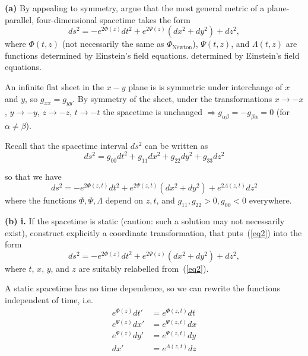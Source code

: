\documentclass[a4paper]{article} %
\begin{document}
\begin{framed}
\textbf{(a)} By appealing to symmetry, argue that the most general metric of a plane-parallel, four-dimensional spacetime takes the form 
\begin{equation}
ds^2=-e^{2\Phi (z)}dt^2 + e^{2\Psi (z)}(dx^2+dy^2)+dz^2,\label{eq2}
\end{equation}
where $\Phi(t,z)$ (not necessarily the same as $\Phi_{\text{Newton}}$), $\Psi(t,z)$, and $\Lambda(t,z)$ are functions determined by Einstein's field equations.
determined by Einstein’s field equations.
\end{framed}

An infinite flat sheet in the $x-y$ plane is is symmetric under interchange of $x$ and $y$, so $g_{xx}=g_{yy}$. By symmetry of the sheet, under the transformations $x\to -x$, $y\to -y$, $z\to -z$, $t\to -t$ the spacetime is unchanged $\Rightarrow g_{\alpha\beta}=-g_{\beta\alpha}=0$ (for $\alpha\neq \beta$).

Recall that the spacetime interval $ds^2$ can be written as
\begin{equation}
ds^2=g_{00}dt^2+g_{11}dx^2+g_{22}dy^{2}+g_{33}dz^2
\end{equation}


so that we have
\begin{equation}
ds^2=-e^{2\Phi(z,t)}dt^2+e^{2\Psi(z,t)}(dx^2+dy^2)+e^{2\Lambda (z,t)}dz^2
\end{equation}
where the functions $\Phi, \Psi, \Lambda$ depend on $z,t$, and $g_{11},g_{22}>0,g_{00}<0$  everywhere.


\begin{framed}
\textbf{(b) i.} If the spacetime is static (caution: such a solution may not necessarily exist), construct explicitly a coordinate transformation, that puts~(\ref{eq2}) into the form 
\begin{equation}
ds^2=-e^{2\Phi(z)} dt^2+e^{2\Psi(z)}(dx^2+dy^2)+dz^2,\label{eq3}
\end{equation}
where $t$, $x$, $y$, and $z$ are suitably relabelled from~(\ref{eq2}).
\end{framed}

A static spacetime has no time dependence, so we can rewrite the functions independent of time, i.e.
\begin{align*}
e^{\Phi(z)}dt'&=e^{\Phi(z,t)}dt\\
e^{\Psi(z)}dx'&=e^{\Psi(z,t)}dx\\
e^{\Psi(z)}dy'&=e^{\Psi(z,t)}dy\\
dx'&=e^{\Lambda(z,t)}dz
\end{align*}
\end{document}
